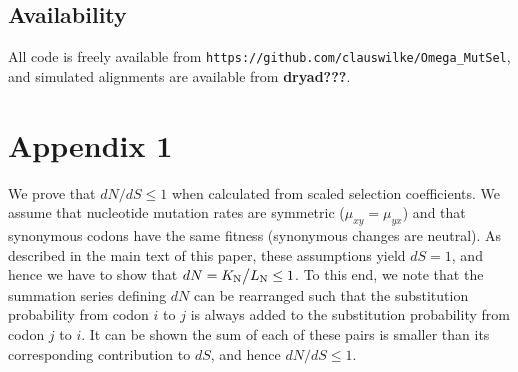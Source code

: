 \documentclass[11pt]{article}
\begin{document}
\subsection*{Availability}
All code is freely available from \texttt{https://github.com/clauswilke/Omega\_MutSel}, and simulated alignments are available from \textbf{dryad???}.



\section*{Appendix 1}
We prove that $dN/dS \leq 1$ when calculated from scaled selection coefficients. We assume that nucleotide mutation rates are symmetric ($\mu_{xy} = \mu_{yx}$) and that synonymous codons have the same fitness (synonymous changes are neutral). As described in the main text of this paper, these assumptions yield $dS = 1$, and hence we have to show that $dN = K_\text{N}\big{/}L_\text{N} \leq 1$. To this end, we note that the summation series defining $dN$ can be rearranged such that the substitution probability from codon $i$ to $j$ is always added to the substitution probability from codon $j$ to $i$. It can be shown the sum of each of these pairs is smaller than its corresponding contribution to $dS$, and hence $dN/dS \leq 1$.
\end{document}
